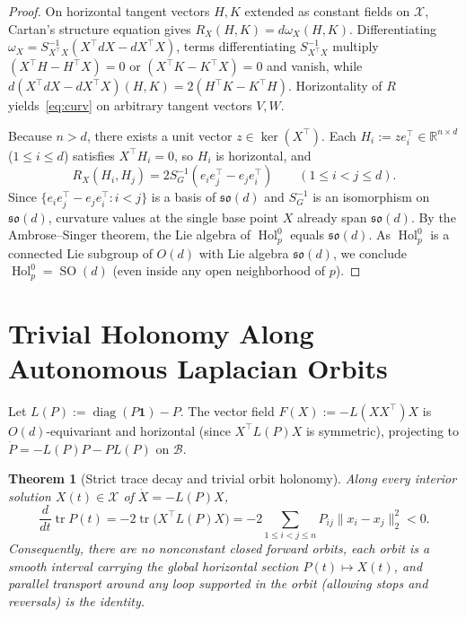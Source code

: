 \documentclass[11pt]{article}
\theoremstyle{plain}
\newtheorem{theorem}{Theorem}
\theoremstyle{definition}
\theoremstyle{remark}
\DeclareMathOperator{\diag}{diag}
\DeclareMathOperator{\tr}{tr}
\DeclareMathOperator{\Hol}{Hol}
\DeclareMathOperator{\SO}{SO}
\begin{document}
\begin{proof}
On horizontal tangent vectors $H, K$ extended as constant fields on $\mathcal{X}$, Cartan's structure equation gives $R_X(H, K) = d\omega_X(H, K)$.
Differentiating $\omega_X = S_{X^\top X}^{-1}(X^\top dX - dX^\top X)$, terms differentiating $S_{X^\top X}^{-1}$ multiply $(X^\top H - H^\top X) = 0$ or $(X^\top K - K^\top X) = 0$ and vanish, while $d(X^\top dX - dX^\top X)(H, K) = 2(H^\top K - K^\top H)$.
Horizontality of $R$ yields~\eqref{eq:curv} on arbitrary tangent vectors $V, W$.

Because $n > d$, there exists a unit vector $z \in \ker(X^\top)$.
Each $H_i := z e_i^\top \in \mathbb{R}^{n \times d}$ ($1 \le i \le d$) satisfies $X^\top H_i = 0$, so $H_i$ is horizontal, and
\[
R_X(H_i, H_j) = 2 S_G^{-1}(e_i e_j^\top - e_j e_i^\top) \qquad (1 \le i < j \le d).
\]
Since $\{e_i e_j^\top - e_j e_i^\top : i < j\}$ is a basis of $\mathfrak{so}(d)$ and $S_G^{-1}$ is an isomorphism on $\mathfrak{so}(d)$, curvature values at the single base point $X$ already span $\mathfrak{so}(d)$.
By the Ambrose--Singer theorem, the Lie algebra of $\Hol_p^0$ equals $\mathfrak{so}(d)$.
As $\Hol_p^0$ is a connected Lie subgroup of $O(d)$ with Lie algebra $\mathfrak{so}(d)$, we conclude $\Hol_p^0 = \SO(d)$ (even inside any open neighborhood of $p$).
\end{proof}

\section{Trivial Holonomy Along Autonomous Laplacian Orbits}

Let $L(P) := \diag(P\mathbf{1}) - P$.
The vector field $F(X) := -L(XX^\top)X$ is $O(d)$-equivariant and horizontal (since $X^\top L(P) X$ is symmetric), projecting to $\dot{P} = -L(P)P - P L(P)$ on $\mathcal{B}$.

\begin{theorem}[Strict trace decay and trivial orbit holonomy]\label{thm:orbit}
Along every interior solution $X(t) \in \mathcal{X}$ of $\dot{X} = -L(P)X$,
\[
\frac{d}{dt}\tr P(t) = -2\tr\bigl(X^\top L(P) X\bigr) = -2\sum_{1 \le i < j \le n} P_{ij}\|x_i - x_j\|_2^2 < 0.
\]
Consequently, there are no nonconstant closed forward orbits, each orbit is a smooth interval carrying the global horizontal section $P(t) \mapsto X(t)$, and parallel transport around any loop supported in the orbit (allowing stops and reversals) is the identity.
\end{theorem}
\end{document}
